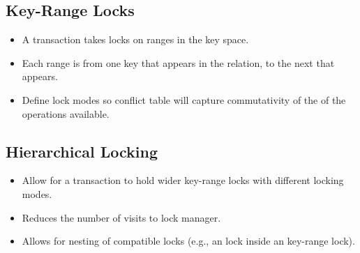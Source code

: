 \documentclass[11pt]{article}
\begin{document}
\subsection*{Key-Range Locks}
\begin{itemize}
    \item
    A transaction takes locks on ranges in the key space.
    
    \item
    Each range is from one key that appears in the relation, to the next that appears.
    
    \item
    Define lock modes so conflict table will capture commutativity of the of the operations 
    available.
\end{itemize}

\subsection*{Hierarchical Locking}
\begin{itemize}
    \item
    Allow for a transaction to hold wider key-range locks with different locking modes.
    
    \item
    Reduces the number of visits to lock manager.
    
    \item Allows for nesting of compatible locks (e.g., an  lock inside an  
    key-range lock).
\end{itemize}

\newpage


\end{document}

